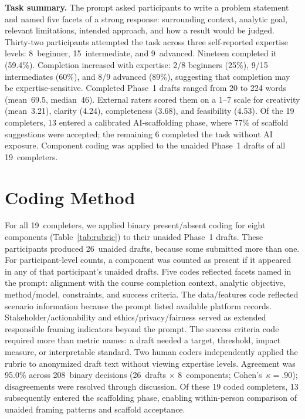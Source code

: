 \documentclass[sigconf,screen,anonymous]{acmart}
\begin{document}
\noindent\textbf{Task summary.} The prompt asked participants to write a problem statement and named five facets of a strong response: surrounding context, analytic goal, relevant limitations, intended approach, and how a result would be judged. Thirty-two participants attempted the task across three self-reported expertise levels: 8~beginner, 15~intermediate, and 9~advanced. Nineteen completed it (59.4\%). Completion increased with expertise: 2/8 beginners (25\%), 9/15 intermediates (60\%), and 8/9 advanced (89\%), suggesting that completion may be expertise-sensitive. Completed Phase~1 drafts ranged from 20 to 224 words (mean~69.5, median~46). External raters scored them on a 1--7 scale for creativity (mean~3.21), clarity (4.24), completeness (3.68), and feasibility (4.53). Of the 19 completers, 13 entered a calibrated AI-scaffolding phase, where 77\% of scaffold suggestions were accepted; the remaining 6 completed the task without AI exposure. Component coding was applied to the unaided Phase~1 drafts of all 19~completers.


\section{Coding Method}
For all 19~completers, we applied binary present/absent coding for eight components (Table~\ref{tab:rubric}) to their unaided Phase~1 drafts. These participants produced 26~unaided drafts, because some submitted more than one. For participant-level counts, a component was counted as present if it appeared in any of that participant's unaided drafts. Five codes reflected facets named in the prompt: alignment with the course completion context, analytic objective, method/model, constraints, and success criteria. The data/features code reflected scenario information because the prompt listed available platform records. Stakeholder/actionability and ethics/privacy/fairness served as extended responsible framing indicators beyond the prompt. The success criteria code required more than metric names: a draft needed a target, threshold, impact measure, or interpretable standard. Two human coders independently applied the rubric to anonymized draft text without viewing expertise levels. Agreement was 95.0\% across 208~binary decisions (26~drafts $\times$ 8~components; Cohen's~$\kappa=.90$); disagreements were resolved through discussion. Of these 19 coded completers, 13 subsequently entered the scaffolding phase, enabling within-person comparison of unaided framing patterns and scaffold acceptance.
\end{document}

